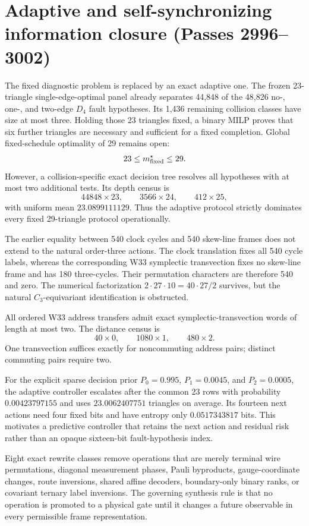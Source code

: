 \section{Adaptive and self-synchronizing information closure (Passes 2996--3002)}
\label{sec:bt2996-3002}

The fixed diagnostic problem is replaced by an exact adaptive one.  The frozen
23-triangle single-edge-optimal panel already separates 44,848 of the 48,826
no-, one-, and two-edge $D_4$ fault hypotheses.  Its 1,436 remaining collision
classes have size at most three.  Holding those 23 triangles fixed, a binary
MILP proves that six further triangles are necessary and sufficient for a fixed
completion.  Global fixed-schedule optimality of 29 remains open:
\[
  23\le m^{\star}_{\rm fixed}\le29.
\]
However, a collision-specific exact decision tree resolves all hypotheses with
at most two additional tests.  Its depth census is
\[
  44848\times23,\qquad3566\times24,\qquad412\times25,
\]
with uniform mean $23.0899111129$.  Thus the adaptive protocol strictly
dominates every fixed 29-triangle protocol operationally.

The earlier equality between 540 clock cycles and 540 skew-line frames does not
extend to the natural order-three actions.  The clock translation fixes all 540
cycle labels, whereas the corresponding W33 symplectic transvection fixes no
skew-line frame and has 180 three-cycles.  Their permutation characters are
therefore 540 and zero.  The numerical factorization
$2\cdot27\cdot10=40\cdot27/2$ survives, but the natural $C_3$-equivariant
identification is obstructed.

All ordered W33 address transfers admit exact symplectic-transvection words of
length at most two.  The distance census is
\[
  40\times0,\qquad1080\times1,\qquad480\times2.
\]
One transvection suffices exactly for noncommuting address pairs; distinct
commuting pairs require two.

For the explicit sparse decision prior
$P_0=0.995$, $P_1=0.0045$, and $P_2=0.0005$, the adaptive controller escalates
after the common 23 rows with probability $0.00423797155$ and uses
$23.0062407751$ triangles on average.  Its fourteen next actions need four fixed
bits and have entropy only $0.0517343817$ bits.  This motivates a predictive
controller that retains the next action and residual risk rather than an opaque
sixteen-bit fault-hypothesis index.

Eight exact rewrite classes remove operations that are merely terminal wire
permutations, diagonal measurement phases, Pauli byproducts, gauge-coordinate
changes, route inversions, shared affine decoders, boundary-only binary ranks,
or covariant ternary label inversions.  The governing synthesis rule is that no
operation is promoted to a physical gate until it changes a future observable
in every permissible frame representation.

